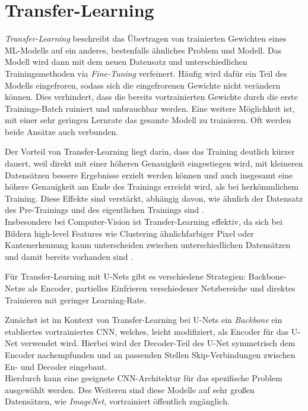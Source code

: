 \section{Transfer-Learning} \label{sec:transfer-learning}

\textit{Transfer-Learning} beschreibt das Übertragen von trainierten Gewichten eines \ac{ML}-Modells auf ein anderes, 
bestenfalls ähnliches Problem und Modell. Das Modell wird dann mit dem neuen Datensatz und unterschiedlichen Trainingsmethoden via \textit{Fine-Tuning} verfeinert.
Häufig wird dafür ein Teil des Modells eingefroren, sodass sich die eingefrorenen Gewichte nicht verändern können. Dies verhindert, 
dass die bereits vortrainierten Gewichte durch die erste Trainings-Batch ruiniert und unbrauchbar werden. Eine weitere Möglichkeit ist,
mit einer sehr geringen Lernrate das gesamte Modell zu trainieren. Oft werden beide Ansätze auch verbunden.

Der Vorteil von Transfer-Learning liegt darin, dass das Training deutlich kürzer dauert, 
weil direkt mit einer höheren Genauigkeit eingestiegen wird, mit kleineren Datensätzen bessere Ergebnisse erzielt werden können
 und auch insgesamt eine höhere Genauigkeit 
am Ende des Trainings erreicht wird, als bei herkömmlichem Training. Diese Effekte sind verstärkt, 
abhängig davon, wie ähnlich der Datensatz des Pre-Trainings und des eigentlichen Trainings sind \cite{Ruder.3212017}. \\
Insbesondere bei Computer-Vision ist Transfer-Learning effektiv, da sich bei Bildern high-level Features wie Clustering 
ähnlichfarbiger Pixel oder Kantenerkennung kaum unterscheiden zwischen unterschiedlichen Datensätzen und damit bereits vorhanden sind \cite{Ruder.3212017}. 

Für Transfer-Learning mit U-Nets gibt es verschiedene Strategien: Backbone-Netze als Encoder, 
partielles Einfrieren verschiedener Netzbereiche und direktes Trainieren mit geringer Learning-Rate.

Zunächst ist im Kontext von Transfer-Learning bei U-Nets ein \textit{Backbone} ein etabliertes vortrainiertes \ac{CNN}, 
welches, leicht modifiziert, als Encoder für das U-Net verwendet wird. Hierbei wird der Decoder-Teil des U-Net 
symmetrisch dem Encoder nachempfunden und an passenden Stellen Skip-Verbindungen zwischen En- und Decoder eingebaut. \\
Hierdurch kann eine geeignete \ac{CNN}-Architektur für das spezifische Problem ausgewählt werden. Des Weiteren sind diese 
Modelle auf sehr großen Datensätzen, wie \textit{ImageNet}, vortrainiert öffentlich zugänglich. 

